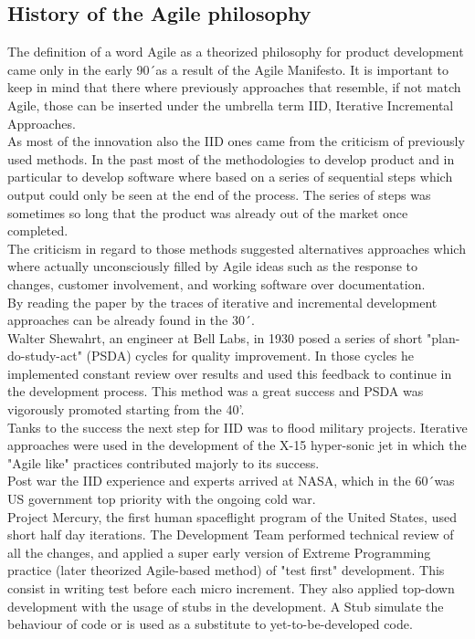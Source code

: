 \documentclass[../main.tex]{subfiles}
\begin{document}
\subsection{History of the Agile philosophy}
The definition of a word Agile as a theorized philosophy for product development came only in the early 90´as a result of the Agile Manifesto. It is important to keep in mind that there where previously approaches that resemble, if not match Agile, those can be inserted under the umbrella term \gls{IID}, Iterative Incremental Approaches.\\
As most of the innovation also the \gls{IID} ones came from the criticism of previously used methods. In the past most of the methodologies to develop product and in particular to develop software where based on a series of sequential steps which output could only be seen at the end of the process. The series of steps was sometimes so long that the product was already out of the market once completed.\\
The criticism in regard to those methods suggested alternatives approaches which where actually unconsciously filled by Agile ideas such as the response to changes, customer involvement, and working software over documentation.\\
By reading the paper by \citet{larman2003iterative} the traces of iterative and incremental development approaches can be already found in the 30´. \\
Walter Shewahrt, an engineer at Bell Labs, in 1930 posed a series of short "plan-do-study-act" (PSDA) cycles for quality improvement. In those cycles he implemented constant review over results and used this feedback to continue in the development process. This method was a great success and PSDA was vigorously promoted starting from the 40'.\\ 
Tanks to the success the next step for \gls{IID} was to flood military projects. Iterative approaches were used in the development of the X-15 hyper-sonic jet in which the "Agile like" practices contributed majorly to its success.\\ Post war the \gls{IID} experience and experts arrived at NASA, which in the 60´was US government top priority with the ongoing cold war.\\
Project Mercury, the first human spaceflight program of the United States, used short half day iterations. The Development Team performed technical review of all the changes, and applied a super early version of Extreme Programming practice (later theorized Agile-based method) of "test first" development. This consist in writing test before each micro increment. They also applied top-down development with the usage of stubs in the development. A Stub simulate the behaviour of code or is used as a substitute to yet-to-be-developed code.\\ 
\end{document}
